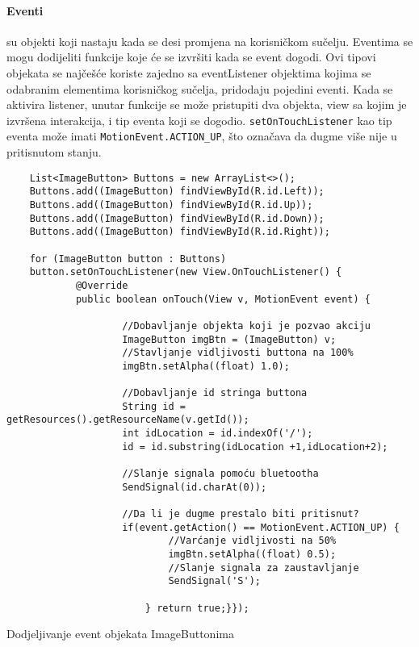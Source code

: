 \documentclass[../Document.tex]{subfiles}
\begin{document}
\paragraph{Eventi}  su objekti koji nastaju kada se desi promjena na korisničkom sučelju. Eventima se mogu dodijeliti funkcije koje će se izvršiti kada se event dogodi. Ovi tipovi objekata se najčešće koriste zajedno sa eventListener objektima kojima se odabranim elementima korisničkog sučelja, pridodaju pojedini eventi. Kada se aktivira listener, unutar funkcije se može pristupiti dva objekta, view sa kojim je izvršena interakcija, i tip eventa koji se dogodio. \verb|setOnTouchListener| kao tip eventa može imati \verb|MotionEvent.ACTION_UP|, što označava da dugme više nije u pritisnutom stanju.

\begin{code}
    \begin{verbatim}
    List<ImageButton> Buttons = new ArrayList<>();
    Buttons.add((ImageButton) findViewById(R.id.Left));
    Buttons.add((ImageButton) findViewById(R.id.Up));
    Buttons.add((ImageButton) findViewById(R.id.Down));
    Buttons.add((ImageButton) findViewById(R.id.Right));

    for (ImageButton button : Buttons)
    button.setOnTouchListener(new View.OnTouchListener() {
            @Override
            public boolean onTouch(View v, MotionEvent event) {

                    //Dobavljanje objekta koji je pozvao akciju
                    ImageButton imgBtn = (ImageButton) v;
                    //Stavljanje vidljivosti buttona na 100%
                    imgBtn.setAlpha((float) 1.0);

                    //Dobavljanje id stringa buttona
                    String id = getResources().getResourceName(v.getId());
                    int idLocation = id.indexOf('/');
                    id = id.substring(idLocation +1,idLocation+2);

                    //Slanje signala pomoću bluetootha
                    SendSignal(id.charAt(0));

                    //Da li je dugme prestalo biti pritisnut?
                    if(event.getAction() == MotionEvent.ACTION_UP) {
                            //Varćanje vidljivosti na 50%
                            imgBtn.setAlpha((float) 0.5);
                            //Slanje signala za zaustavljanje
                            SendSignal('S');

                        } return true;}});
    \end{verbatim}
    \caption{Dodjeljivanje event objekata ImageButtonima}
\end{code}
\end{document}
